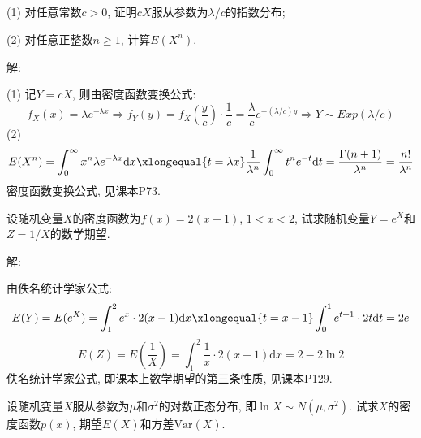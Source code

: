 \documentclass[standard]{ExBook}
\begin{document}
\begin{qitems}
\begin{bbox}
\begin{shaded}
(1) 对任意常数$c>0$, 证明$cX$服从参数为$\lambda/c$的指数分布;

(2) 对任意正整数$n\geq 1$, 计算$E(X^n)$.
    \end{shaded}
    \end{bbox}

\vspace{-5em}

    \begin{bbox}
解:

(1) 记$Y=cX$, 则由密度函数变换公式:
$$f_{X}(x)=\lambda e^{-\lambda x} \Longrightarrow f_{Y}(y)=f_{X}(\frac{y}{c})\cdot\frac{1}{c}=\frac{\lambda}{c}e^{-(\lambda/c)y} \Longrightarrow Y\sim Exp(\lambda/c)$$
(2)
$$E(X^n)=\displaystyle\int_{0}^{\infty}x^n \lambda e^{-\lambda x}\mathrm{d}x \xlongequal{t=\lambda x} \frac{1}{\lambda^n}\int_{0}^{\infty}t^n e^{-t}\mathrm{d}t=\frac{\Gamma(n+1)}{\lambda^n}=\frac{n!}{\lambda^n}$$
\textcolor{themeColor}{\selectfont {} 密度函数变换公式, 见课本P73.}
    \end{bbox}

\vspace{-5em}

    \begin{bbox}
    \begin{shaded}
        \qitem
设随机变量$X$的密度函数为$f(x)=2(x-1)$, $1<x<2$, 试求随机变量$Y=e^{X}$和$Z=1/X$的数学期望.
    \end{shaded}
    \end{bbox}

\vspace{-5em}

    \begin{bbox}
解: 

由佚名统计学家公式:
$$E(Y)=E(e^X)=\displaystyle\int_{1}^{2}e^{x}\cdot2(x-1)\mathrm{d}x \xlongequal{t=x-1} \int_{0}^{1}e^{t+1}\cdot 2t\mathrm{d}t=2e$$
$$E(Z)=E(\frac{1}{X})=\displaystyle\int_{1}^{2}\frac{1}{x}\cdot 2(x-1)\mathrm{d}x=2-2\ln 2$$
\textcolor{themeColor}{\selectfont {} 佚名统计学家公式, 即课本上数学期望的第三条性质, 见课本P129.}
    \end{bbox}

\vspace{-5em}

    \begin{bbox}
    \begin{shaded}
        \qitem
设随机变量$ X $服从参数为$\mu$和$\sigma^2$的对数正态分布, 即$\ln X\sim N(\mu,\sigma^2)$. 试求$ X $的密度函数$p(x)$, 期望$ E(X) $和方差$\mathrm{Var}(X)$.
    \end{shaded}
    \end{bbox}


\end{qitems}
\end{document}

